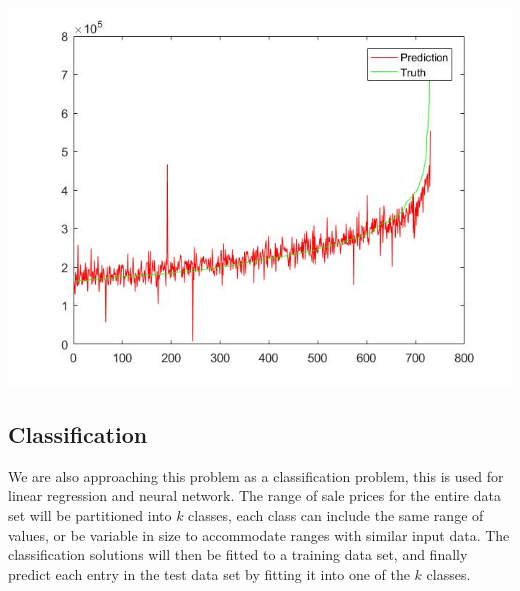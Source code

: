 \documentclass[letter,10pt]{article}
\begin{document}
\begin{multicols}{2}
\begin{center}
			\includegraphics[scale=0.35]{Images/linearRegression} \\
			\label{fig:linr_predictions}
		\end{center}
		\par
		\subsection{Classification}
			We are also approaching this problem as a classification problem, this is used for linear regression and neural network. The range of sale prices for the entire data set will be partitioned into \(k\) classes, each class can include the same range of values, or be variable in size to accommodate ranges with similar input data. The classification solutions will then be fitted to a training data set, and finally predict each entry in the test data set by fitting it into one of the \(k\) classes.

\end{multicols}
\end{document}
